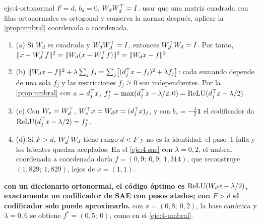 \begin{solucion}{eje:4-ortonormal}
\datos $F=d$, $b_d=0$, $W_dW_d^{\top}=I$.
\planteamiento usar que una matriz cuadrada con filas ortonormales es ortogonal y conserva la norma; después, aplicar la \cref{prop:umbral} coordenada a coordenada.
\pasos
\begin{enumerate}[label=\arabic*.]
  \item (a) Si $W_d$ es cuadrada y $W_dW_d^{\top}=I$, entonces $W_d^{\top} W_d=I$. Por tanto, $\lVert x-W_d^{\top} f\rVert^{2}=\lVert W_d(x-W_d^{\top} f)\rVert^{2}=\lVert W_dx-f\rVert^{2}$.
  \item (b) $\lVert W_dx-f\rVert^{2}+\lambda\sum_jf_j=\sum_j\bigl[(d_j^{\top} x-f_j)^{2}+\lambda f_j\bigr]$: cada sumando depende de una sola $f_j$ y las restricciones $f_j\ge 0$ son independientes. Por la \cref{prop:umbral} con $a=d_j^{\top} x$, $f_j^{*}=\max(d_j^{\top} x-\lambda/2,0)=\operatorname{ReLU}(d_j^{\top} x-\lambda/2)$.
  \item (c) Con $W_e=W_d^{\top}$, $W_e^{\top} x=W_dx=(d_j^{\top} x)_j$, y con $b_e=-\tfrac\lambda2\mathbf{1}$ el codificador da $\operatorname{ReLU}(d_j^{\top} x-\lambda/2)=f_j^{*}$.
  \item (d) Si $F>d$, $W_d^{\top} W_d$ tiene rango $d<F$ y no es la identidad: el paso~1 falla y los latentes quedan acoplados. En el \cref{eje:4-sae} con $\lambda=0{,}2$, el umbral coordenada a coordenada daría $f=(0{,}9;\allowbreak\ 0{,}9;\allowbreak\ 1{,}314)$, que reconstruye $(1{,}829;\allowbreak\ 1{,}829)$, lejos de $x=(1,1)$.
\end{enumerate}
\resultado \textbf{con un diccionario ortonormal, el código óptimo es $\operatorname{ReLU}(W_dx-\lambda/2)$, exactamente un codificador de SAE con pesos atados; con $F>d$ el codificador solo puede aproximarlo.}
\comprobacion con $x=(0{,}8;\allowbreak\ 0{,}2)$, la base canónica y $\lambda=0{,}6$ se obtiene $f^{*}=(0{,}5;\allowbreak\ 0)$, como en el \cref{eje:4-umbral}.
\end{solucion}

